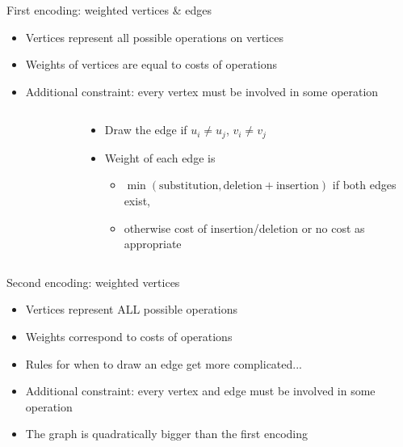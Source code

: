 \documentclass{beamer}
\begin{document}
\begin{frame}{First encoding: weighted vertices \& edges}
  \begin{itemize}
  \item Vertices represent all possible operations on vertices
  \item Weights of vertices are equal to costs of operations
  \item Additional constraint: every vertex must be involved in some operation
  \end{itemize}
\end{frame}
\begin{frame}
  \begin{columns}
    \begin{column}{0.3\textwidth}
      \begin{figure}
      \end{figure}
    \end{column}
    \begin{column}{0.7\textwidth}
      \begin{itemize}
      \item Draw the edge if $u_i \ne u_j$, $v_i \ne v_j$
      \item Weight of each edge is
        \begin{itemize}
        \item $\min(\text{substitution}, \text{deletion}+\text{insertion})$ if both edges exist,
        \item otherwise cost of insertion/deletion or no cost as appropriate
        \end{itemize}
      \end{itemize}
    \end{column}
  \end{columns}
\end{frame}
\begin{frame}{Second encoding: weighted vertices}
\begin{itemize}
\item Vertices represent ALL possible operations
\item Weights correspond to costs of operations
\item Rules for when to draw an edge get more complicated...
\item Additional constraint: every vertex and edge must be involved in some operation
\item The graph is quadratically bigger than the first encoding
\end{itemize}
\end{frame}
\end{document}
